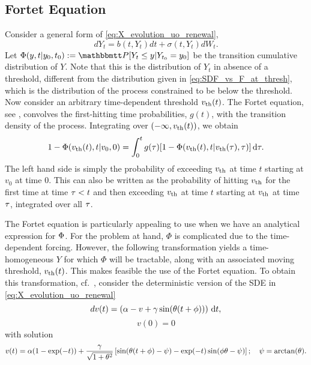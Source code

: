\subsection{Fortet Equation}
\label{sec:fortet_estimation}
Consider a general form of \cref{eq:X_evolution_uo_renewal}, $$ dY_t =
b(t,Y_t)dt + \sigma(t,Y_t) dW_t. $$ Let $\F(y,t| y_0, t_0) :=   \Prob[Y_t \leq
y| Y_{t_0} = y_0]$ be the transition cumulative distribution of $Y$. Note that
this is the distribution of $Y_t$ in absence of a threshold, different from the
distribution given in \cref{eq:SDF_vs_F_at_thresh},
 which is the distribution 
of the process constrained to be below the threshold. 
Now consider an arbitrary time-dependent threshold ${ v_{\textrm{th} } }(t)$. The Fortet
equation, see \cite{Fortet1943}, convolves the first-hitting time probabilities,
$g(t)$, with the transition density of the process. Integrating
over $(-\infty, { v_{\textrm{th} } }(t))$, we obtain
\begin{equation}
1 - {\Phi}({ v_{\textrm{th} } }(t), t|v_0, 0) =
\int_0^t g(\tau) [1-{\Phi} ({ v_{\textrm{th} } }(t),  t| { v_{\textrm{th} } }({\tau}), {\tau})] \, \mathrm{d} {\tau}.
\label{eq:Fortet_moving_vth}
\end{equation}
The left hand side is simply the probability of exceeding ${ v_{\textrm{th} } }$ at time
$t$ starting at $v_0$ at time $0$. This can also be written as the probability
of hitting ${ v_{\textrm{th} } }$ for the first time at time ${\tau} < t$ and then exceeding
${ v_{\textrm{th} } }$ at time $t$ starting at ${ v_{\textrm{th} } }$ at time ${\tau}$, integrated over all ${\tau}$.

The Fortet equation is particularly appealing to use when we have an analytical
expression for ${\Phi}$. For the problem at hand, $\Phi$ is complicated
due to the time-dependent forcing. However, the following transformation yields
a time-homogeneous $Y$ for which $\Phi$ will be tractable, along with an associated
moving threshold, ${ v_{\textrm{th} } }(t)$. This makes feasible
the use of the Fortet equation. To obtain this transformation, cf.\
\cite{Shimokawa1999}, consider the deterministic version of the SDE in
\cref{eq:X_evolution_uo_renewal} 
\begin{equation}
dv(t) = \left( \alpha - v + {\gamma } \sin({ \theta} (t + \phi) ) \right) \, \mathrm{d} t,
\label{eq:LIF_deterministic}
\end{equation}
$$v(0) = 0
$$
with solution
\begin{equation}
v(t) = \alpha( 1- \exp(-t)) 
  + \frac{{\gamma }}{\sqrt{1+{ \theta}^2}} 
\left[  \sin({ \theta}(t + \phi) - \psi )
 - \exp(-t)\sin(\phi{ \theta} - \psi ) \right]; \quad  
\psi = \arctan({ \theta}).
\label{eq:LIF_deterministic_solution}
\end{equation}

